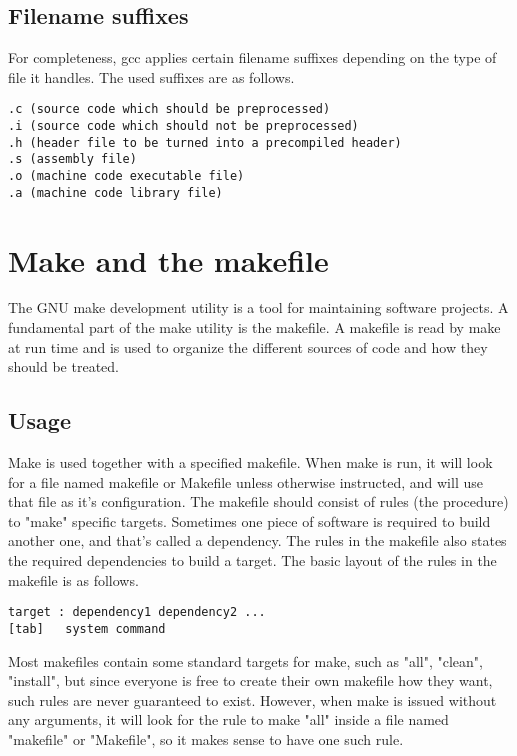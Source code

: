\documentclass[a4paper,10pt]{article}
\begin{document}
\subsection{Filename suffixes}
For completeness, gcc applies certain filename suffixes depending on the type of file it handles. The used suffixes are as follows.

\begin{verbatim}
.c (source code which should be preprocessed)
.i (source code which should not be preprocessed)
.h (header file to be turned into a precompiled header)
.s (assembly file)
.o (machine code executable file)
.a (machine code library file)
\end{verbatim}

\section{Make and the makefile}
The GNU make development utility is a tool for maintaining software projects. A fundamental part of the make utility is the makefile. A makefile is read by make at run time and is used to organize the different sources of code and how they should be treated.

\subsection{Usage}
Make is used together with a specified makefile. When make is run, it will look for a file named makefile or Makefile unless otherwise instructed, and will use that file as it's configuration. The makefile should consist of rules (the procedure) to "make" specific targets. Sometimes one piece of software is required to build another one, and that's called a dependency. The rules in the makefile also states the required dependencies to build a target. The basic layout of the rules in the makefile is as follows.

\begin{verbatim}
target : dependency1 dependency2 ...
[tab] 	system command
\end{verbatim}

Most makefiles contain some standard targets for make, such as "all", "clean", "install", but since everyone is free to create their own makefile how they want, such rules are never guaranteed to exist. However, when make is issued without any arguments, it will look for the rule to make "all" inside a file named "makefile" or "Makefile", so it makes sense to have one such rule.
\end{document}
